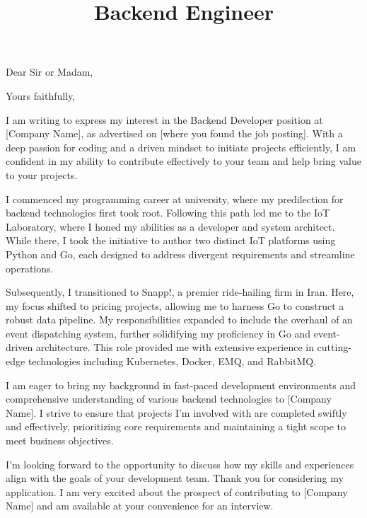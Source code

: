 \documentclass[11pt,a4paper,sans]{moderncv}
\title{Backend Engineer}
\begin{document}
\maketitle

\opening{Dear Sir or Madam,}
\closing{Yours faithfully,}
\makelettertitle

I am writing to express my interest in the Backend Developer position at [Company Name],
as advertised on [where you found the job posting]. With a deep passion for coding and a driven mindset to initiate projects efficiently,
I am confident in my ability to contribute effectively to your team and help bring value to your projects.

I commenced my programming career at university, where my predilection for backend technologies first took root.
Following this path led me to the IoT Laboratory, where I honed my abilities as a developer and system architect.
While there, I took the initiative to author two distinct IoT platforms using Python and Go, each designed to address divergent requirements and streamline operations.

Subsequently, I transitioned to Snapp!, a premier ride-hailing firm in Iran. Here, my focus shifted to pricing projects,
allowing me to harness Go to construct a robust data pipeline. My responsibilities expanded to include the overhaul of an event dispatching system,
further solidifying my proficiency in Go and event-driven architecture.
This role provided me with extensive experience in cutting-edge technologies including Kubernetes, Docker, EMQ, and RabbitMQ.

I am eager to bring my background in fast-paced development environments and comprehensive understanding of
various backend technologies to [Company Name].
I strive to ensure that projects I’m involved with are completed swiftly and effectively,
prioritizing core requirements and maintaining a tight scope to meet business objectives.

I’m looking forward to the opportunity to discuss how my skills and experiences align with the goals of
your development team. Thank you for considering my application.
I am very excited about the prospect of contributing to [Company Name] and am available at your convenience for an interview.

\makeletterclosing
\end{document}
